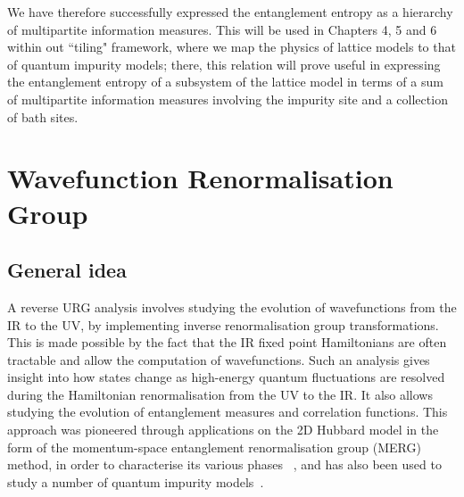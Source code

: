 We have therefore successfully expressed the entanglement entropy as a hierarchy of multipartite information measures. This will be used in Chapters 4, 5 and 6 within out ``tiling" framework, where we map the physics of lattice models to that of quantum impurity models; there, this relation will prove useful in expressing the entanglement entropy of a subsystem of the lattice model in terms of a sum of multipartite information measures involving the impurity site and a collection of bath sites.

\section{Wavefunction Renormalisation Group}

\subsection{General idea}
A reverse URG analysis involves studying the evolution of wavefunctions from the IR to the UV, by implementing inverse renormalisation group transformations. This is made possible by the fact that the IR fixed point Hamiltonians are often tractable and allow the computation of wavefunctions. Such an analysis gives insight into how states change as high-energy quantum fluctuations are resolved during the Hamiltonian renormalisation from the UV to the IR. It also allows studying the evolution of entanglement measures and correlation functions. This approach was pioneered through applications on the 2D Hubbard model in the form of the momentum-space entanglement renormalisation group (MERG) method, in order to characterise its various phases ~\cite{anirban_mott_2022,PatraEntanglement2023}, and has also been used to study a number of quantum impurity models~\cite{anirban_kondo,Patra2023MCK}.

